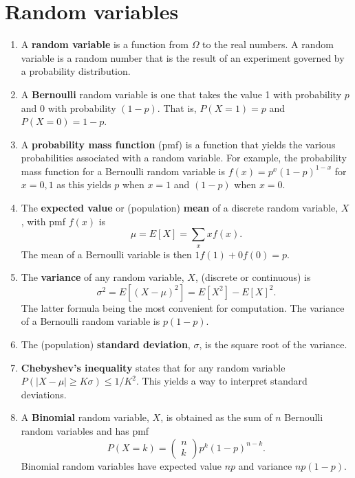 \documentclass[12pt]{article}
\begin{document}
  \section{Random variables}
  \begin{enumerate}[1.]
  \item A {\bf random variable} is a function from $\Omega$ to the real numbers.
    A random variable is a random number that is the result of an experiment
    governed by a probability distribution.
  \item A {\bf Bernoulli}  random
    variable is one that takes the value 1 with probability $p$ and 0
    with probability $(1 - p)$. That is, $P(X = 1) = p$ and $P(X = 0) =
    1 - p$.
  \item A {\bf probability mass function} (pmf) is a function that yields the various
    probabilities associated with a random variable. For example, the probability
    mass function for a Bernoulli random variable is $f(x) = p^x(1 - p)^{1 - x}$ for $x = 0, 1$
    as this yields $p$ when $x = 1$ and $(1 - p)$ when $x = 0$.
  \item The {\bf expected value} or (population) {\bf mean} 
    of a discrete random variable, $X$, with pmf $f(x)$ is
    $$
    \mu = E[X] = \sum_{x} x f(x).
    $$
    The mean of a Bernoulli variable is then $1 f(1) + 0 f(0) = p$.
  \item The {\bf variance} of any random variable, $X$, (discrete or continuous) is
    $$
    \sigma^2 = E\left[(X - \mu)^2\right] = E[X^2] - E[X]^2.
    $$
    The latter formula being the most convenient for computation. The variance of 
    a Bernoulli random variable is $p(1-p)$.
  \item The (population) {\bf standard deviation}, $\sigma$, is the
    square root of the variance.
  \item {\bf Chebyshev's inequality} states that for any random variable
    $P(|X - \mu| \geq K\sigma) \leq 1 / K ^ 2$.  This yields a way to
    interpret standard deviations. 
  \item A {\bf Binomial} random variable, $X$, is obtained as the sum of $n$ Bernoulli
    random variables and has pmf
    $$
    P(X = k) = \left(\begin{array}{c} n \\ k \end{array}\right) p^k(1 - p)^{n - k}.
    $$
    Binomial random variables have expected value $np$ and variance $np(1-p)$.
\end{enumerate}
\end{document}
